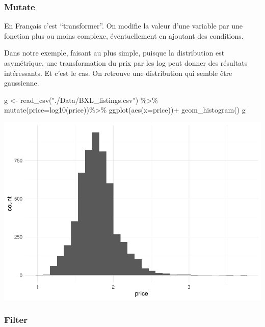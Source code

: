 \documentclass[
]{book}
\newenvironment{Shaded}{\begin{snugshade}}{\end{snugshade}}
\newcommand{\AttributeTok}[1]{\textcolor[rgb]{0.77,0.63,0.00}{#1}}
\newcommand{\FunctionTok}[1]{\textcolor[rgb]{0.00,0.00,0.00}{#1}}
\newcommand{\NormalTok}[1]{#1}
\newcommand{\OtherTok}[1]{\textcolor[rgb]{0.56,0.35,0.01}{#1}}
\newcommand{\SpecialCharTok}[1]{\textcolor[rgb]{0.00,0.00,0.00}{#1}}
\newcommand{\StringTok}[1]{\textcolor[rgb]{0.31,0.60,0.02}{#1}}
\begin{document}
\hypertarget{mutate}{%
\subsubsection{Mutate}\label{mutate}}

En Français c'est ``transformer''. On modifie la valeur d'une variable par une fonction plus ou moins complexe, éventuellement en ajoutant des conditions.

Dans notre exemple, faisant au plus simple, puisque la distribution est asymétrique, une transformation du prix par les log peut donner des résultats intéressants. Et c'est le cas. On retrouve une distribution qui semble être gaussienne.

\begin{Shaded}
\begin{Highlighting}[]
\NormalTok{g }\OtherTok{\textless{}{-}} \FunctionTok{read\_csv}\NormalTok{(}\StringTok{"./Data/BXL\_listings.csv"}\NormalTok{) }\SpecialCharTok{\%\textgreater{}\%} 
  \FunctionTok{mutate}\NormalTok{(}\AttributeTok{price=}\FunctionTok{log10}\NormalTok{(price))}\SpecialCharTok{\%\textgreater{}\%}
  \FunctionTok{ggplot}\NormalTok{(}\FunctionTok{aes}\NormalTok{(}\AttributeTok{x=}\NormalTok{price))}\SpecialCharTok{+}
  \FunctionTok{geom\_histogram}\NormalTok{()}
\NormalTok{g}
\end{Highlighting}
\end{Shaded}

\includegraphics{bookdown-demo_files/figure-latex/0204-1.pdf}

\hypertarget{filter}{%
\subsubsection{Filter}\label{filter}}
\end{document}
